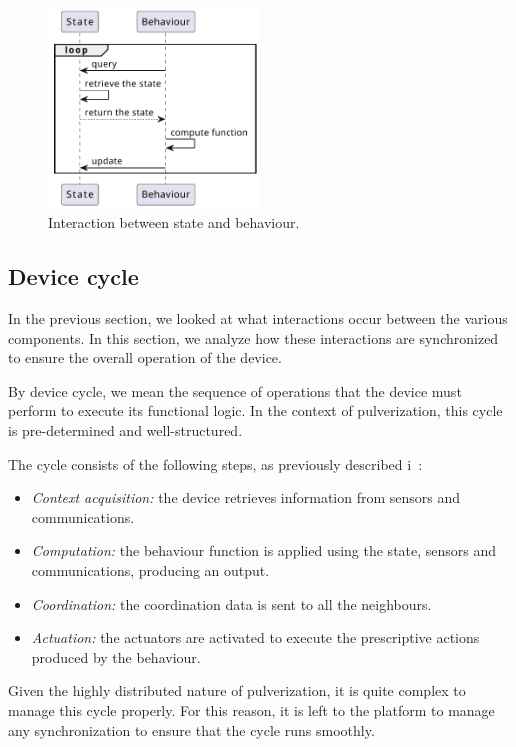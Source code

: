 \begin{figure}
	\centering
	\includegraphics[width=0.5\textwidth]{figures/sequence-diagram-state.pdf}
	\caption{Interaction between state and behaviour.}
	\label{fig:framework-components-interaction-2-state-behaviour}
\end{figure}

\subsection{Device cycle}
\label{sec:framework-device-cycle}

In the previous section, we looked at what interactions occur between the various components. In this section, we analyze how these interactions
are synchronized to ensure the overall operation of the device.

By device cycle, we mean the sequence of operations that the device must perform to execute its functional logic. In the context of pulverization,
this cycle is pre-determined and well-structured.

The cycle consists of the following steps, as previously described i~:

\begin{itemize}
	\item \emph{Context acquisition:} the device retrieves information from sensors and communications.
	\item \emph{Computation:} the behaviour function is applied using the state, sensors and communications, producing an output.
	\item \emph{Coordination:} the coordination data is sent to all the neighbours.
	\item \emph{Actuation:} the actuators are activated to execute the prescriptive actions produced by the behaviour.
\end{itemize}

Given the highly distributed nature of pulverization, it is quite complex to manage this cycle properly. For this reason, it is left to the platform
to manage any synchronization to ensure that the cycle runs smoothly.

